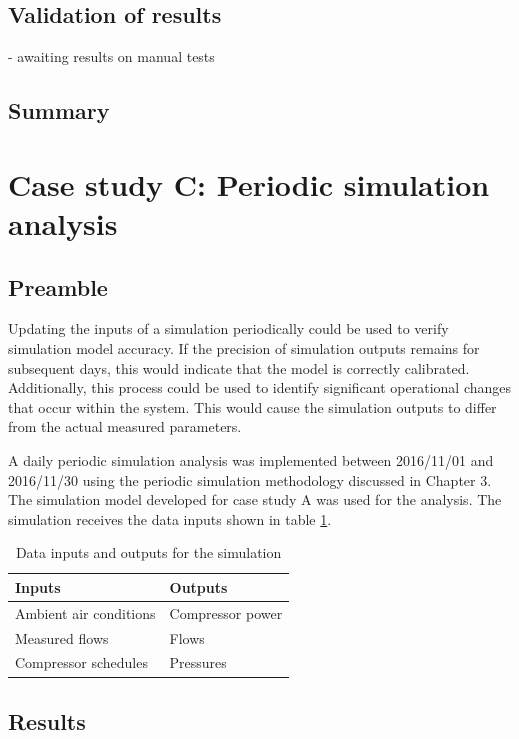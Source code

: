 	\subsection{Validation of results}
	
	- awaiting results on manual tests
	
	\subsection{Summary}
\newpage

\section{Case study C: Periodic simulation analysis}
	\subsection{Preamble}
	Updating the inputs of a simulation periodically could be used to verify simulation model accuracy. If the precision of simulation outputs remains for subsequent days, this would indicate that the model is correctly calibrated. Additionally, this process could be used to identify significant operational changes that occur within the system. This would cause the simulation outputs to differ from the actual measured parameters. 
	\par 
	A daily periodic simulation  analysis was implemented between 2016/11/01 and 2016/11/30 using the periodic simulation methodology discussed in Chapter 3. The simulation model developed for case study A was used for the analysis. The simulation receives the data inputs shown in table \ref{table: Periodic inputs/outputs}.
	\begin{table}[h]
		\centering
		\begin{tabular}{ll}
			\hline
			Inputs \hspace*{4cm}    &Outputs \hspace*{4cm}    \\  \hline
			Ambient air conditions&Compressor power \\
			Measured flows& Flows \\
			Compressor schedules& Pressures \\
			\hline
		\end{tabular}
		\caption{Data inputs and outputs for the simulation}
		\label{table: Periodic inputs/outputs}
	\end{table}

\subsection{Results}

